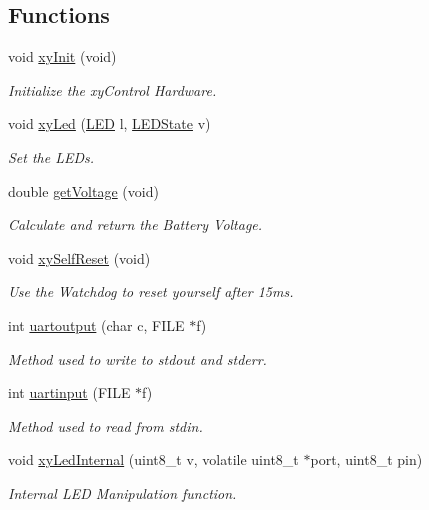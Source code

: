\subsection*{Functions}
\begin{DoxyCompactItemize}
\item 
void \hyperlink{group__xycontrol_ga2b3fb0734a2675e6dbdcb2c7665a708f}{xy\-Init} (void)
\begin{DoxyCompactList}\small\item\em Initialize the xy\-Control Hardware. \end{DoxyCompactList}\item 
void \hyperlink{group__xycontrol_ga783aead7f97dd462a9af56b7fc3b228f}{xy\-Led} (\hyperlink{group__xycontrol_gaadcb6002d2b42fdfe01490f730ab00a6}{L\-E\-D} l, \hyperlink{group__xycontrol_ga51a69e0b98357e170e63bc843e2fd1c0}{L\-E\-D\-State} v)
\begin{DoxyCompactList}\small\item\em Set the L\-E\-Ds. \end{DoxyCompactList}\item 
double \hyperlink{group__xycontrol_ga97874cf2a7f8e6964188b54fe85084a6}{get\-Voltage} (void)
\begin{DoxyCompactList}\small\item\em Calculate and return the Battery Voltage. \end{DoxyCompactList}\item 
void \hyperlink{group__xycontrol_ga26f242fc9cc1fb7dfdb78daae5579a63}{xy\-Self\-Reset} (void)
\begin{DoxyCompactList}\small\item\em Use the Watchdog to reset yourself after 15ms. \end{DoxyCompactList}\item 
int \hyperlink{group__xycontrol_ga7e2be90354ccc3af05947764858bc0b1}{uartoutput} (char c, F\-I\-L\-E $\ast$f)
\begin{DoxyCompactList}\small\item\em Method used to write to stdout and stderr. \end{DoxyCompactList}\item 
int \hyperlink{group__xycontrol_ga3f158de66529c4606b8d8a380e5a5b07}{uartinput} (F\-I\-L\-E $\ast$f)
\begin{DoxyCompactList}\small\item\em Method used to read from stdin. \end{DoxyCompactList}\item 
void \hyperlink{group__xycontrol_ga8b94cac17e75735eec6f6fa42d21ab72}{xy\-Led\-Internal} (uint8\-\_\-t v, volatile uint8\-\_\-t $\ast$port, uint8\-\_\-t pin)
\begin{DoxyCompactList}\small\item\em Internal L\-E\-D Manipulation function. \end{DoxyCompactList}\end{DoxyCompactItemize}
